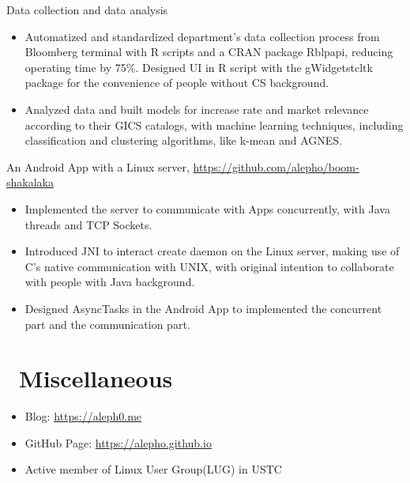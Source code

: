 \documentclass{resume}
\begin{document}
 \null
Data collection and data analysis
\begin{itemize}
  \item Automatized and standardized department's data collection process from Bloomberg terminal with R scripts and a CRAN package Rblpapi, reducing operating time by 75\%. Designed UI in R script with the gWidgetstcltk package for the convenience of people without CS background.
  \item Analyzed data and built models for increase rate and market relevance according to their GICS catalogs, with machine learning techniques, including classification and clustering algorithms, like k-mean and AGNES.
\end{itemize}

An Android App with a Linux server, \href{https://github.com/alepho/boom-shakalaka}{https://github.com/alepho/boom-shakalaka}
\begin{itemize}
  \item Implemented the server to communicate with Apps concurrently, with Java threads and TCP Sockets.  
  \item Introduced JNI to interact create daemon on the Linux server, making use of C's native communication with UNIX, with original intention to collaborate with people with Java background.
  \item Designed AsyncTasks in the Android App to implemented the concurrent part and the communication part. 
\end{itemize}





\section{\texorpdfstring{\faInfo}\ \ Miscellaneous}
\begin{itemize}[parsep=0.5ex]
  \item Blog: \href{https://aleph0.me}{https://aleph0.me}
  \item GitHub Page: \href{https://alepho.github.io}{https://alepho.github.io}
  \item Active member of Linux User Group(LUG) in USTC
\end{itemize}

%
%
\end{document}
